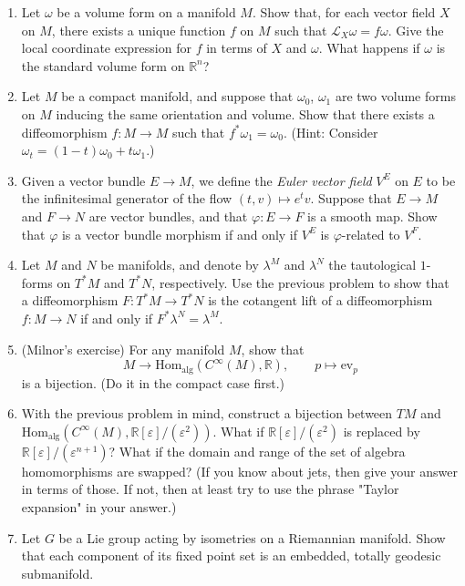 \documentclass[11pt]{article} %
\begin{document}
\begin{enumerate}
	\item Let $\omega$ be a volume form on a manifold $M$. Show that, for each vector field $X$ on $M$, there exists a unique function $f$ on $M$ such that $\mathcal{L}_X\omega = f\omega$. Give the local coordinate expression for $f$ in terms of $X$ and $\omega$. What happens if $\omega$ is the standard volume form on $\mathbb{R}^n$? 

	\item Let $M$ be a compact manifold, and suppose that $\omega_0$, $\omega_1$ are two volume forms on $M$ inducing the same orientation and volume. Show that there exists a diffeomorphism $f\colon M \to M$ such that $f^*\omega_1 = \omega_0$. (Hint: Consider $\omega_t = (1 - t)\omega_0 + t\omega_1$.) 

	\item Given a vector bundle $E \to M$, we define the \emph{Euler vector field} $V^E$ on $E$ to be the infinitesimal generator of the flow $(t, v) \mapsto e^t v$. Suppose that $E \to M$ and $F \to N$ are vector bundles, and that $\varphi\colon E \to F$ is a smooth map. Show that $\varphi$ is a vector bundle morphism if and only if $V^E$ is $\varphi$-related to $V^F$.

	\item Let $M$ and $N$ be manifolds, and denote by $\lambda^M$ and $\lambda^N$ the tautological $1$-forms on $T^*M$ and $T^*N$, respectively. Use the previous problem to show that a diffeomorphism $F\colon T^*M \to T^*N$ is the cotangent lift of a diffeomorphism $f\colon M \to N$ if and only if $F^*\lambda^N = \lambda^M$.

	\item (Milnor's exercise) For any manifold $M$, show that 
	\[
		M \to \mathrm{Hom}_{\mathrm{alg}}(C^\infty(M), \mathbb{R}), \qquad p \mapsto \mathrm{ev}_p
	\]
	is a bijection. (Do it in the compact case first.)

	\item With the previous problem in mind, construct a bijection between $TM$ and $\mathrm{Hom}_{\mathrm{alg}}(C^\infty(M), \mathbb{R}[\varepsilon]/(\varepsilon^2))$. What if $\mathbb{R}[\varepsilon]/(\varepsilon^2)$ is replaced by $\mathbb{R}[\varepsilon]/(\varepsilon^{n+1})$? What if the domain and range of the set of algebra homomorphisms are swapped? (If you know about jets, then give your answer in terms of those. If not, then at least try to use the phrase "Taylor expansion" in your answer.)

	\item Let $G$ be a Lie group acting by isometries on a Riemannian manifold. Show that each component of its fixed point set is an embedded, totally geodesic submanifold.


\end{enumerate}
\end{document}
